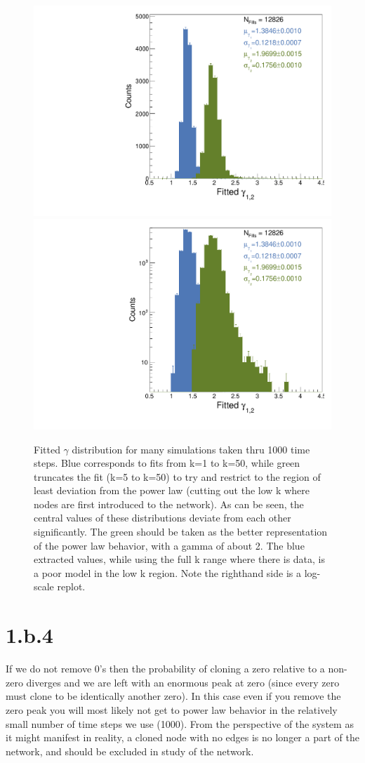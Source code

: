 \documentclass{article}
\begin{document}
\begin{figure}[H]
    \centering
    \includegraphics[width=.49\textwidth]{gammaCanv.pdf} 
    \includegraphics[width=.49\textwidth]{gammaCanv_LOG.pdf} 
    \caption{Fitted $\gamma$ distribution for many simulations taken thru 1000 time steps. Blue corresponds to fits from k=1 to k=50, while green truncates the fit (k=5 to k=50) to try and restrict to the region of least deviation from the power law (cutting out the low k where nodes are first introduced to the network). As can be seen, the central values of these distributions deviate from each other significantly. The green should be taken as the better representation of the power law behavior, with a gamma of about 2. The blue extracted values, while using the full k range where there is data, is a poor model in the low k region. Note the righthand side is a log-scale replot.}
    \label{fig2}
\end{figure}


\section{1.b.4}

If we do not remove 0's then the probability of cloning a zero relative to a non-zero diverges and we are left with an enormous peak at zero (since every zero must clone to be identically another zero). In this case even if you remove the zero peak you will most likely not get to power law behavior in the relatively small number of time steps we use (1000). From the perspective of the system as it might manifest in reality, a cloned node with no edges is no longer a part of the network, and should be excluded in study of the network.
\end{document}
